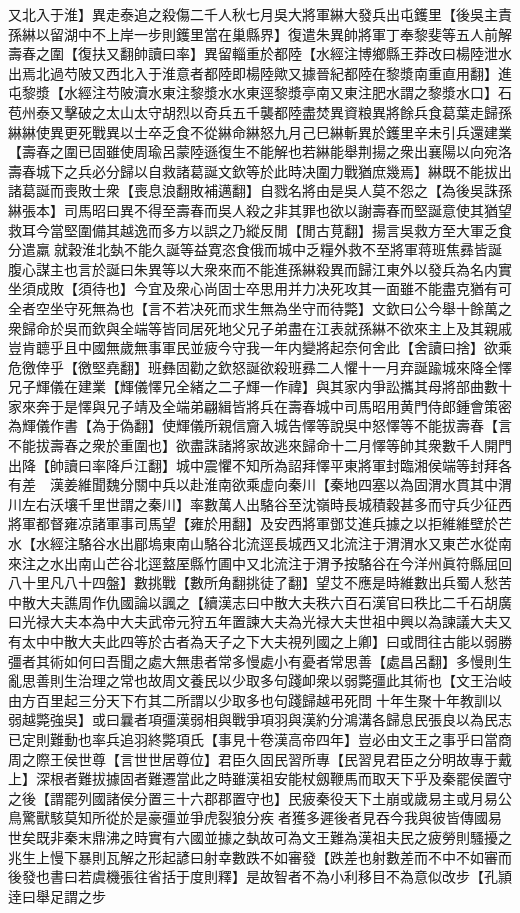 又北入于淮】異走泰追之殺傷二千人秋七月吳大將軍綝大發兵出屯鑊里【後吳主責孫綝以留湖中不上岸一步則鑊里當在巢縣界】復遣朱異帥將軍丁奉黎斐等五人前解壽春之圍【復扶又翻帥讀曰率】異留輜重於都陸【水經注博鄉縣王莽改曰楊陸泄水出焉北過芍陂又西北入于淮意者都陸即楊陸歟又據晉紀都陸在黎漿南重直用翻】進屯黎漿【水經注芍陂瀆水東注黎漿水水東逕黎漿亭南又東注肥水謂之黎漿水口】石苞州泰又擊破之太山太守胡烈以奇兵五千襲都陸盡焚異資粮異將餘兵食葛葉走歸孫綝綝使異更死戰異以士卒乏食不從綝命綝怒九月己巳綝斬異於鑊里辛未引兵還建業【壽春之圍已固雖使周瑜呂蒙陸遜復生不能解也若綝能舉荆揚之衆出襄陽以向宛洛壽春城下之兵必分歸以自救諸葛誕文欽等於此時决圍力戰猶庶幾焉】綝既不能拔出諸葛誕而喪敗士衆【喪息浪翻敗補邁翻】自戮名將由是吳人莫不怨之【為後吳誅孫綝張本】司馬昭曰異不得至壽春而吳人殺之非其罪也欲以謝壽春而堅誕意使其猶望救耳今當堅圍備其越逸而多方以誤之乃縱反閒【閒古莧翻】揚言吳救方至大軍乏食分遣羸就穀淮北埶不能久誕等益寛恣食俄而城中乏糧外救不至將軍蒋班焦彞皆誕腹心謀主也言於誕曰朱異等以大衆來而不能進孫綝殺異而歸江東外以發兵為名内實坐須成敗【須待也】今宜及衆心尚固士卒思用并力决死攻其一面雖不能盡克猶有可全者空坐守死無為也【言不若决死而求生無為坐守而待斃】文欽曰公今舉十餘萬之衆歸命於吳而欽與全端等皆同居死地父兄子弟盡在江表就孫綝不欲來主上及其親戚豈肯聼乎且中國無歲無事軍民並疲今守我一年内變將起奈何舍此【舍讀曰捨】欲乘危徼倖乎【徼堅堯翻】班彝固勸之欽怒誕欲殺班彞二人懼十一月弃誕踰城來降全懌兄子輝儀在建業【輝儀懌兄全緒之二子輝一作禕】與其家内爭訟攜其母將部曲數十家來奔于是懌與兄子靖及全端弟翩緝皆將兵在壽春城中司馬昭用黄門侍郎鍾會策密為輝儀作書【為于偽翻】使輝儀所親信齎入城告懌等說吳中怒懌等不能拔壽春【言不能拔壽春之衆於重圍也】欲盡誅諸將家故逃來歸命十二月懌等帥其衆數千人開門出降【帥讀曰率降戶江翻】城中震懼不知所為詔拜懌平東將軍封臨湘侯端等封拜各有差　漢姜維聞魏分關中兵以赴淮南欲乘虚向秦川【秦地四塞以為固渭水貫其中渭川左右沃壤千里世謂之秦川】率數萬人出駱谷至沈嶺時長城積穀甚多而守兵少征西將軍都督雍凉諸軍事司馬望【雍於用翻】及安西將軍鄧艾進兵據之以拒維維壁於芒水【水經注駱谷水出郿塢東南山駱谷北流逕長城西又北流注于渭渭水又東芒水從南來注之水出南山芒谷北逕盩厔縣竹圃中又北流注于渭予按駱谷在今洋州眞符縣屈回八十里凡八十四盤】數挑戰【數所角翻挑徒了翻】望艾不應是時維數出兵蜀人愁苦中散大夫譙周作仇國論以諷之【續漢志曰中散大夫秩六百石漢官曰秩比二千石胡廣曰光禄大夫本為中大夫武帝元狩五年置諫大夫為光禄大夫世祖中興以為諫議大夫又有太中中散大夫此四等於古者為天子之下大夫視列國之上卿】曰或問往古能以弱勝彊者其術如何曰吾聞之處大無患者常多慢處小有憂者常思善【處昌呂翻】多慢則生亂思善則生治理之常也故周文養民以少取多句踐卹衆以弱斃彊此其術也【文王治岐由方百里起三分天下冇其二所謂以少取多也句踐歸越弔死問十年生聚十年教訓以弱越斃強吳】或曰曩者項彊漢弱相與戰爭項羽與漢約分鴻溝各歸息民張良以為民志已定則難動也率兵追羽終斃項氏【事見十卷漢高帝四年】豈必由文王之事乎曰當商周之際王侯世尊【言世世居尊位】君臣久固民習所專【民習見君臣之分明故專于戴上】深根者難拔據固者難遷當此之時雖漢祖安能杖劔鞭馬而取天下乎及秦罷侯置守之後【謂罷列國諸侯分置三十六郡郡置守也】民疲秦役天下土崩或歲易主或月易公鳥驚獸駭莫知所從於是豪彊並爭虎裂狼分疾者獲多遲後者見吞今我與彼皆傳國易世矣既非秦末鼎沸之時實有六國並據之埶故可為文王難為漢祖夫民之疲勞則騷擾之兆生上慢下暴則瓦解之形起諺曰射幸數跌不如審發【跌差也射數差而不中不如審而後發也書曰若虞機張往省括于度則釋】是故智者不為小利移目不為意似改步【孔頴逹曰舉足謂之步